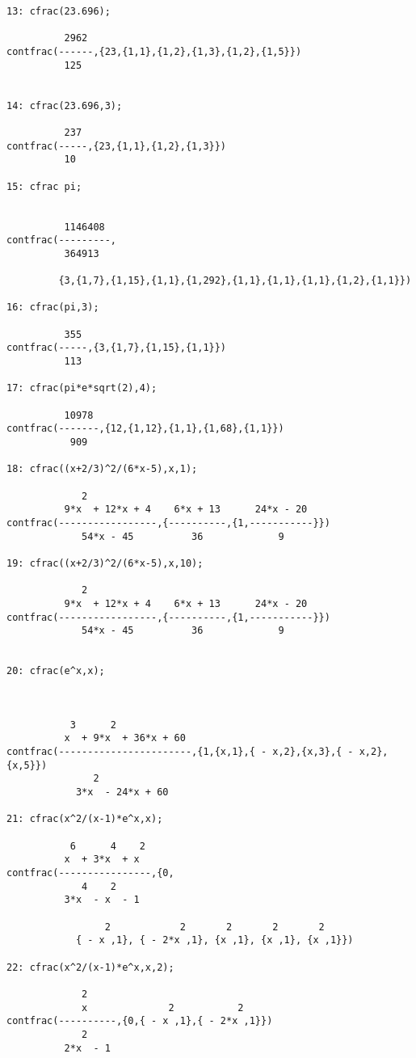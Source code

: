 \begin{verbatim}
13: cfrac(23.696);

          2962
contfrac(------,{23,{1,1},{1,2},{1,3},{1,2},{1,5}})
          125


14: cfrac(23.696,3);

          237
contfrac(-----,{23,{1,1},{1,2},{1,3}})
          10

15: cfrac pi;


          1146408
contfrac(---------,
          364913

         {3,{1,7},{1,15},{1,1},{1,292},{1,1},{1,1},{1,1},{1,2},{1,1}})

16: cfrac(pi,3);

          355
contfrac(-----,{3,{1,7},{1,15},{1,1}})
          113

17: cfrac(pi*e*sqrt(2),4);

          10978
contfrac(-------,{12,{1,12},{1,1},{1,68},{1,1}})
           909

18: cfrac((x+2/3)^2/(6*x-5),x,1);

             2
          9*x  + 12*x + 4    6*x + 13      24*x - 20
contfrac(-----------------,{----------,{1,-----------}})
             54*x - 45          36             9

19: cfrac((x+2/3)^2/(6*x-5),x,10);

             2
          9*x  + 12*x + 4    6*x + 13      24*x - 20
contfrac(-----------------,{----------,{1,-----------}})
             54*x - 45          36             9


20: cfrac(e^x,x);



           3      2
          x  + 9*x  + 36*x + 60
contfrac(-----------------------,{1,{x,1},{ - x,2},{x,3},{ - x,2},{x,5}})
               2
            3*x  - 24*x + 60

21: cfrac(x^2/(x-1)*e^x,x);

           6      4    2
          x  + 3*x  + x
contfrac(----------------,{0,
             4    2
          3*x  - x  - 1

                 2            2       2       2       2
            { - x ,1}, { - 2*x ,1}, {x ,1}, {x ,1}, {x ,1}})

22: cfrac(x^2/(x-1)*e^x,x,2);

             2
             x              2           2
contfrac(----------,{0,{ - x ,1},{ - 2*x ,1}})
             2
          2*x  - 1

\end{verbatim}

